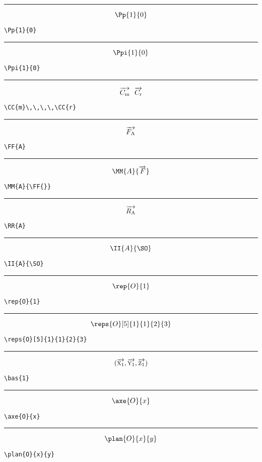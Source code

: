 \documentclass[a4paper,9pt]{article}
\begin{document}
\hrule

$$\Pp{1}{0}$$
\begin{verbatim}
\Pp{1}{0}
\end{verbatim}

\hrule

$$\Ppi{1}{0}$$
\begin{verbatim}
\Ppi{1}{0}
\end{verbatim}

\hrule

$$\overrightarrow{C_{\mathrm{m}}}\,\,\,\,\overrightarrow{C_{\mathrm{r}}}$$
\begin{verbatim}
\CC{m}\,\,\,\,\CC{r}
\end{verbatim}

\hrule

$$\overrightarrow{F_{\mathrm{A}}}$$
\begin{verbatim}
\FF{A}
\end{verbatim}

\hrule

$$\MM{A}{\FF{}}$$
\begin{verbatim}
\MM{A}{\FF{}}
\end{verbatim}

\hrule

$$\overrightarrow{R_{\mathrm{A}}}$$
\begin{verbatim}
\RR{A}
\end{verbatim}

\hrule

$$\II{A}{\SO}$$
\begin{verbatim}
\II{A}{\SO}
\end{verbatim}

\hrule

$$\rep{O}{1}$$
\begin{verbatim}
\rep{O}{1}
\end{verbatim}

\hrule

$$\reps{O}[5]{1}{1}{2}{3}$$
\begin{verbatim}
\reps{O}[5]{1}{1}{2}{3}
\end{verbatim}

\hrule

$$(\overrightarrow{\textsc{x}_{1}},\overrightarrow{\textsc{y}_{1}},\overrightarrow{\textsc{z}_{1}})$$
\begin{verbatim}
\bas{1}
\end{verbatim}

\hrule

$$\axe{O}{x}$$
\begin{verbatim}
\axe{O}{x}
\end{verbatim}

\hrule

$$\plan{O}{x}{y}$$
\begin{verbatim}
\plan{O}{x}{y}
\end{verbatim}
\end{document}
